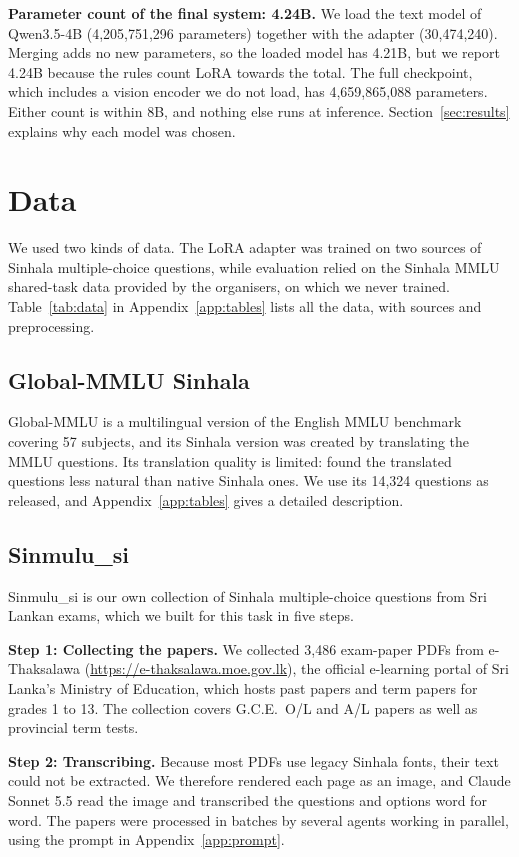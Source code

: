 \documentclass[11pt]{article}
\newcommand{\para}[1]{\smallskip\noindent\textbf{#1}\enspace}
\newcommand{\sinmulu}{Sinmulu\_si}
\begin{document}
\para{Parameter count of the final system: 4.24B.} We load the text model of Qwen3.5-4B (4,205,751,296 parameters) together with the adapter (30,474,240). Merging adds no new parameters, so the loaded model has 4.21B, but we report 4.24B because the rules count LoRA towards the total. The full checkpoint, which includes a vision encoder we do not load, has 4,659,865,088 parameters. Either count is within 8B, and nothing else runs at inference. Section~\ref{sec:results} explains why each model was chosen.

\section{Data}\label{sec:data}
We used two kinds of data. The LoRA adapter was trained on two sources of Sinhala multiple-choice questions, while evaluation relied on the Sinhala MMLU shared-task data provided by the organisers, on which we never trained. Table~\ref{tab:data} in Appendix~\ref{app:tables} lists all the data, with sources and preprocessing.

\subsection{Global-MMLU Sinhala}
Global-MMLU \citep{singh2025globalmmlu} is a multilingual version of the English MMLU benchmark covering 57 subjects, and its Sinhala version was created by translating the MMLU questions. Its translation quality is limited: \citet{pramodya2025sinhalammlu} found the translated questions less natural than native Sinhala ones. We use its 14,324 questions as released, and Appendix~\ref{app:tables} gives a detailed description.

\subsection{\sinmulu{}}\label{sec:sinmulu}
\sinmulu{} is our own collection of Sinhala multiple-choice questions from Sri Lankan exams, which we built for this task in five steps.

\para{Step 1: Collecting the papers.} We collected 3,486 exam-paper PDFs from e-Thaksalawa (\url{https://e-thaksalawa.moe.gov.lk}), the official e-learning portal of Sri Lanka's Ministry of Education, which hosts past papers and term papers for grades 1 to 13. The collection covers G.C.E.\ O/L and A/L papers as well as provincial term tests.

\para{Step 2: Transcribing.} Because most PDFs use legacy Sinhala fonts, their text could not be extracted. We therefore rendered each page as an image, and Claude Sonnet 5.5 read the image and transcribed the questions and options word for word. The papers were processed in batches by several agents working in parallel, using the prompt in Appendix~\ref{app:prompt}.
\end{document}
